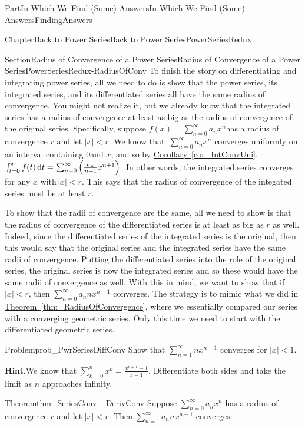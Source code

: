 \documentclass[oneside,10pt,]{book}
\newcommand{\blocktitlefont}{\relax}
\newcommand{\xreffont}{\relax}
\numberwithin{equation}{part}
\newcommand{\dx}[1]{\,{\rm d}#1}
\newcommand{\lt}{<}
\begin{document}
\begin{partptx}{Part}{In Which We Find (Some) Answers}{}{In Which We Find (Some) Answers}{}{}{FindingAnswers}
\begin{chapterptx}{Chapter}{Back to Power Series}{}{Back to Power Series}{}{}{PowerSeriesRedux}
\begin{sectionptx}{Section}{Radius of Convergence of a Power Series}{}{Radius of Convergence of a Power Series}{}{}{PowerSeriesRedux-RadiusOfConv}
To finish the story on differentiating and integrating power series, all we need to do is show that the power series, its integrated series, and its differentiated series all have the same radius of convergence.  You might not realize it, but we already know that the integrated series has a radius of convergence at least as big as the radius of convergence of the original series.  Specifically, suppose \(f(x)=\sum_{n=0}^\infty a_nx^n\)has a radius of convergence \(r\) and let \(|x|\lt r\).  We know that \(\,\sum_{n=0}^\infty a_nx^n\) converges uniformly on an interval containing \(0\)and \(x\), and so by \hyperref[cor_IntConvUni]{Corollary~{\xreffont\ref{cor_IntConvUni}}}, \(\int_{t=0}^xf(t)\dx{
t}=\sum_{n=0}^\infty\left(\frac{a_n}{n+1}x^{n+1}\right)\).  In other words, the integrated series converges for any \(x\) with\(\,|x|\lt r\).  This says that the radius of convergence of the integated series must be at least \(r\).%
\par
To show that the radii of convergence are the same, all we need to show is that the radius of convergence of the differentiated series is at least as big as \(r\) as well.  Indeed, since the differentiated series of the integrated series is the original, then this would say that the original series and the integrated series have the same radii of convergence.  Putting the differentiated series into the role of the original series, the original series is now the integrated series and so these would have the same radii of convergence as well.  With this in mind, we want to show that if \(|x|\lt r\), then \(\sum_{n=0}^\infty a_nnx^{n-1}\) converges.  The strategy is to mimic what we did in \hyperref[thm_RadiusOfConvergence]{Theorem~{\xreffont\ref{thm_RadiusOfConvergence}}}, where we essentially compared our series with a converging geometric series.  Only this time we need to start with the differentiated geometric series.%
\begin{problem}{Problem}{}{prob_PwrSeriesDiffConv}%
Show that \(\sum_{n=1}^\infty nx^{n-1}\) converges for \(|x|\lt 1\).%
\par\smallskip%
\noindent\textbf{\blocktitlefont Hint}.\hypertarget{prob_PwrSeriesDiffConv-4}{}\quad{}We know that \(\sum_{k=0}^nx^k=\frac{x^{n+1}-1}{x-1}\). Differentiate both sides and take the limit as \(n\) approaches infinity.%
\end{problem}
\begin{theorem}{Theorem}{}{}{thm_SeriesConv-_DerivConv}%
 Suppose \(\sum_{n=0}^\infty a_nx^n\) has a radius of convergence \(r\) and let \(|x|\lt r\).  Then \(\sum_{n=1}^\infty a_nnx^{n-1}\) converges.%

\end{theorem}
\end{sectionptx}
\end{chapterptx}
\end{partptx}
\end{document}
